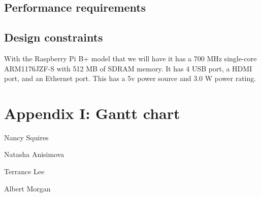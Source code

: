 \documentclass[10pt,journal,draftclsnofoot,onecolumn]{IEEEtran}
\begin{document}
	\subsection{Performance requirements}
	\subsection{Design constraints}
	With the Raspberry Pi B+ model that we will have it has a 700 MHz single-core ARM1176JZF-S with 512 MB of SDRAM memory.  It has 4 USB port, a HDMI port, and an Ethernet port.  This has a 5v power source and 3.0 W power rating.

	
	
\section{Appendix I: Gantt chart}

\begin{minipage}{\textwidth}
	
	\vspace{1in}
	\noindent Nancy Squires

	\vspace{1in}
	\noindent Natasha Anisimova

	\vspace{1in}
	\noindent Terrance Lee

	\vspace{1in}
	\noindent Albert Morgan\\

\end{minipage}
\end{document}
